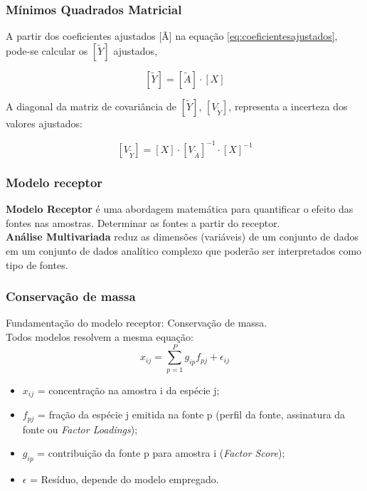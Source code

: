 \begin{frame}
  \frametitle{Mínimos Quadrados Matricial}
A partir dos coeficientes ajustados [Ã] na equação \ref{eq:coeficientesajustados},
pode-se calcular os $[\tilde{Y}]$ ajustados,

\begin{equation*}
  \label{eq:polinomioajustado}
  [\tilde{Y}] = [\tilde{A}]\cdot[X]
\end{equation*}

A diagonal da matriz de covariância de $[\tilde{Y}]$, $[V_{\tilde{Y}}]$, 
representa a incerteza dos valores ajustados:

\begin{equation*}
  \label{eq:matrizcovarianciaY}
  [V_{\tilde{Y}}] = [X] \cdot [V_{\tilde{A}}]^{-1} \cdot [X]^{-1}
\end{equation*}

\end{frame}

\begin{frame}
  \frametitle{Modelo receptor}
  \textbf{Modelo Receptor} é uma abordagem matemática para quantificar o efeito das fontes 
  nas amostras. Determinar as fontes a partir do receptor. \\
  \textbf{Análise Multivariada} reduz as dimensões (variáveis) de um conjunto de dados 
  em um conjunto de dados analítico complexo que poderão ser interpretados como 
  tipo de fontes.
\end{frame}

\begin{frame}
  \frametitle{Conservação de massa}
  Fundamentação do modelo receptor: Conservação de massa. \\
  Todos modelos resolvem a mesma equação: 
  \begin{equation*}
    x_{ij} = \sum_{p=1}^{P} g_{ip}f_{pj} + \epsilon_{ij}
  \end{equation*} 
 
  \begin{itemize}
    \item $x_{ij}$ = concentração na amostra i da espécie j;
    \item $f_{pj}$ = fração da espécie j emitida na fonte p 
                    (perfil da fonte, assinatura da fonte ou \textit{Factor Loadings}); 
    \item $g_{ip}$ = contribuição da fonte p para amostra i (\textit{Factor Score});
    \item $\epsilon$ = Resíduo, depende do modelo empregado.
  \end{itemize}
\end{frame}

